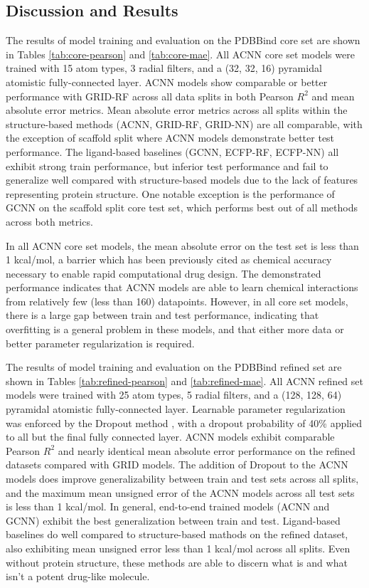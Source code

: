 \subsection{Discussion and Results}
The results of model training and evaluation on the PDBBind core set are shown in Tables \ref{tab:core-pearson} and \ref{tab:core-mae}.  All ACNN core set models were trained with 15 atom types, 3 radial filters, and a (32, 32, 16) pyramidal atomistic fully-connected layer. ACNN models show comparable or better performance with GRID-RF across all data splits in both Pearson $R^2$ and mean absolute error metrics.  Mean absolute error metrics across all splits within the structure-based methods (ACNN, GRID-RF, GRID-NN) are all comparable, with the exception of scaffold split where ACNN models demonstrate better test performance.  The ligand-based baselines (GCNN, ECFP-RF, ECFP-NN) all exhibit strong train performance, but inferior test performance and fail to generalize well compared with structure-based models due to the lack of features representing protein structure.  One notable exception is the performance of GCNN on the scaffold split core test set, which performs best out of all methods across both metrics.

In all ACNN core set models, the mean absolute error on the test set is less than 1 kcal/mol, a barrier which has been previously cited as chemical accuracy necessary to enable rapid computational drug design.\cite{peterson2012chemical} The demonstrated performance indicates that ACNN models are able to learn chemical interactions from relatively few (less than 160) datapoints. However, in all core set models, there is a large gap between train and test performance, indicating that overfitting is a general problem in these models, and that either more data or better parameter regularization is required.

The results of model training and evaluation on the PDBBind refined set are shown in Tables \ref{tab:refined-pearson} and \ref{tab:refined-mae}.  All ACNN refined set models were trained with 25 atom types, 5 radial filters, and a (128, 128, 64) pyramidal atomistic fully-connected layer.  Learnable parameter regularization was enforced by the Dropout method \cite{srivastava2014dropout}, with a dropout probability of 40\% applied to all but the final fully connected layer.  ACNN models exhibit comparable Pearson $R^2$ and nearly identical mean absolute error performance on the refined datasets compared with GRID models.  The addition of Dropout to the ACNN models does improve generalizability between train and test sets across all splits, and the maximum mean unsigned error of the ACNN models across all test sets is less than 1 kcal/mol.  In general, end-to-end trained models (ACNN and GCNN) exhibit the best generalization between train and test. Ligand-based baselines do well compared to structure-based mathods on the refined dataset, also exhibiting mean unsigned error less than 1 kcal/mol across all splits.  Even without protein structure, these methods are able to discern what is and what isn't a potent drug-like molecule.    

